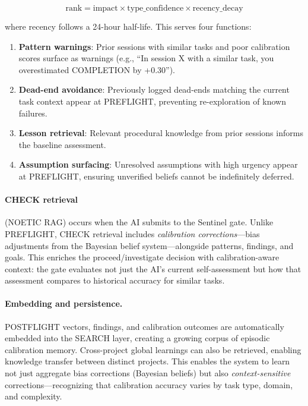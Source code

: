 \begin{equation}
\text{rank} = \text{impact} \times \text{type\_confidence} \times \text{recency\_decay}
\end{equation}

\noindent where recency follows a 24-hour half-life. This serves four functions:

\begin{enumerate}
    \item \textbf{Pattern warnings}: Prior sessions with similar tasks and poor calibration scores surface as warnings (e.g., ``In session X with a similar task, you overestimated COMPLETION by +0.30'').
    \item \textbf{Dead-end avoidance}: Previously logged dead-ends matching the current task context appear at PREFLIGHT, preventing re-exploration of known failures.
    \item \textbf{Lesson retrieval}: Relevant procedural knowledge from prior sessions informs the baseline assessment.
    \item \textbf{Assumption surfacing}: Unresolved assumptions with high urgency appear at PREFLIGHT, ensuring unverified beliefs cannot be indefinitely deferred.
\end{enumerate}

\paragraph{CHECK retrieval} (NOETIC RAG) occurs when the AI submits to the Sentinel gate. Unlike PREFLIGHT, CHECK retrieval includes \emph{calibration corrections}---bias adjustments from the Bayesian belief system---alongside patterns, findings, and goals. This enriches the proceed/investigate decision with calibration-aware context: the gate evaluates not just the AI's current self-assessment but how that assessment compares to historical accuracy for similar tasks.

\paragraph{Embedding and persistence.} POSTFLIGHT vectors, findings, and calibration outcomes are automatically embedded into the SEARCH layer, creating a growing corpus of episodic calibration memory. Cross-project global learnings can also be retrieved, enabling knowledge transfer between distinct projects. This enables the system to learn not just aggregate bias corrections (Bayesian beliefs) but also \emph{context-sensitive} corrections---recognizing that calibration accuracy varies by task type, domain, and complexity.

